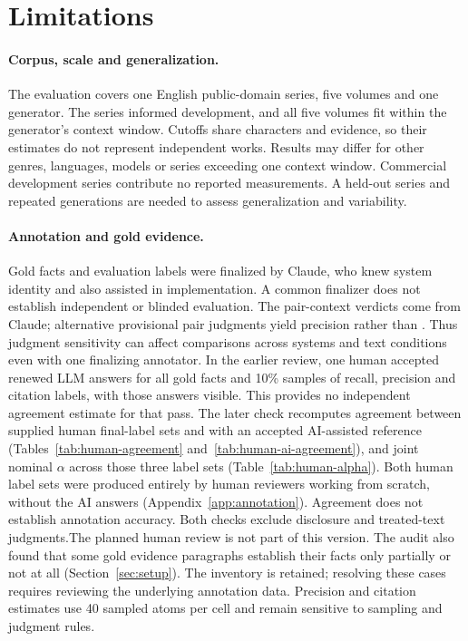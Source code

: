 \section*{Limitations}
\label{sec:limitations}

\paragraph{Corpus, scale and generalization.}
The evaluation covers one English public-domain series, five volumes and one generator.
The series informed development, and all five volumes fit within the generator's context
window. Cutoffs share characters and evidence, so their estimates do not represent
independent works. Results may differ for other genres, languages, models or series
exceeding one context window. Commercial development series contribute no reported
measurements. A held-out series and repeated generations are needed to assess
generalization and variability.

\paragraph{Annotation and gold evidence.}
Gold facts and evaluation labels were finalized by Claude, who knew system identity and
also assisted in implementation. A common finalizer does not establish independent or
blinded evaluation. The pair-context verdicts come from Claude; alternative provisional
pair judgments yield precision  rather than
. Thus judgment sensitivity can affect comparisons across systems and
text conditions even with one finalizing annotator.
\ifnwhuman In the earlier review, one human accepted renewed LLM answers for all gold facts and 10\%
samples of recall, precision and citation labels, with those answers visible. This provides
no independent agreement estimate for that pass. The later check recomputes agreement between
supplied human final-label sets and with an accepted AI-assisted reference (Tables~\ref{tab:human-agreement}
and~\ref{tab:human-ai-agreement}), and joint nominal $\alpha$ across those three label sets
(Table~\ref{tab:human-alpha}). Both human label sets were produced entirely by human
reviewers working from scratch, without the AI answers (Appendix~\ref{app:annotation}).
Agreement does not establish annotation accuracy. Both checks exclude disclosure and
treated-text judgments.\else The planned human review is not part of this version.\fi{}
The audit also found that some gold evidence paragraphs establish their facts only partially
or not at all (Section~\ref{sec:setup}). The inventory is retained; resolving these cases
requires reviewing the underlying annotation data. Precision and citation estimates use
40 sampled atoms per cell and remain sensitive to sampling and judgment rules.


